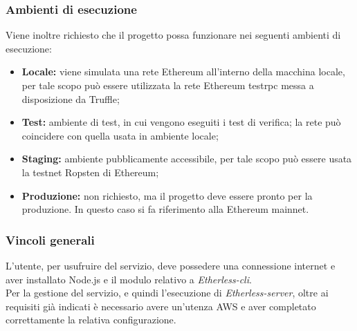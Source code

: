 \subsubsection{Ambienti di esecuzione}
Viene inoltre richiesto che il progetto possa funzionare nei seguenti ambienti di esecuzione: 
	\begin{itemize}
		\item \textbf{Locale:} viene simulata una rete Ethereum all'interno della macchina locale, per tale scopo può essere utilizzata la rete Ethereum  testrpc messa a disposizione da Truffle; 
		\item \textbf{Test:} ambiente di test, in cui vengono eseguiti i test di verifica; la rete può coincidere con quella usata in ambiente locale; 
		\item \textbf{Staging:} ambiente pubblicamente accessibile, per tale scopo può essere usata la testnet Ropsten di Ethereum;
		\item \textbf{Produzione:} non richiesto, ma il progetto deve essere pronto per la produzione. In questo caso si fa riferimento alla Ethereum mainnet. 
	\end{itemize}

\subsubsection{Vincoli generali}
L'utente, per usufruire del servizio, deve possedere una connessione internet e aver installato Node.js e il modulo relativo a \textit{Etherless-cli}. \\ 
Per la gestione del servizio, e quindi l'esecuzione di \textit{Etherless-server}, oltre ai requisiti già indicati è necessario avere un'utenza AWS e aver completato correttamente la relativa configurazione. 
